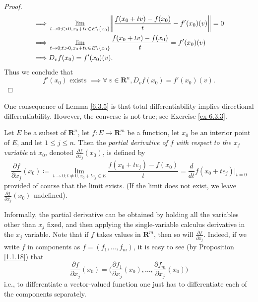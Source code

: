 \begin{proof}
\begin{align*}
        \implies & \lim_{t \to 0 ; t > 0, x_0 + tv \in E \setminus \{x_0\}} \norm*{\frac{f(x_0 + tv) - f(x_0)}{t} - f'(x_0)(v)} = 0                                   \\
        \implies & \lim_{t \to 0 ; t > 0, x_0 + tv \in E \setminus \{x_0\}} \frac{f(x_0 + tv) - f(x_0)}{t} = f'(x_0)(v)                                               \\
        \implies & D_v f(x_0) = f'(x_0)(v).
    \end{align*}
    Thus we conclude that
    \[
        f'(x_0) \text{ exists } \implies \forall\ v \in \mathbf{R}^n, D_v f(x_0) = f'(x_0)(v).
    \]
\end{proof}

\begin{remark}\label{6.3.6}
    One consequence of Lemma \ref{6.3.5} is that total differentiability implies directional differentiability.
    However, the converse is not true;
    see Exercise \ref{ex 6.3.3}.
\end{remark}

\begin{definition}\label{6.3.7}
    Let \(E\) be a subset of \(\mathbf{R}^n\), let \(f : E \to \mathbf{R}^m\) be a function, let \(x_0\) be an interior point of \(E\), and let \(1 \leq j \leq n\).
    Then the \emph{partial derivative of \(f\) with respect to the \(x_j\) variable} at \(x_0\), denoted \(\frac{\partial f}{\partial x_j}(x_0)\), is defined by
    \[
        \frac{\partial f}{\partial x_j}(x_0) \coloneqq \lim_{t \to 0 ; t \neq 0, x_0 + t e_j \in E} \frac{f(x_0 + t e_j) - f(x_0)}{t} = \frac{d}{dt} f(x_0 + t e_j)|_{t = 0}
    \]
    provided of course that the limit exists.
    (If the limit does not exist, we leave \(\frac{\partial f}{\partial x_j}(x_0)\) undefined).
\end{definition}

\begin{additional corollary}\label{ac 6.3.1}
Informally, the partial derivative can be obtained by holding all the variables other than \(x_j\) fixed, and then applying the single-variable calculus derivative in the \(x_j\) variable.
Note that if \(f\) takes values in \(\mathbf{R}^m\), then so will \(\frac{\partial f}{\partial x_j}\).
Indeed, if we write \(f\) in components as \(f = (f_1, \dots, f_m)\), it is easy to see (by Proposition \ref{1.1.18}) that
\[
    \frac{\partial f}{\partial x_j}(x_0) = \bigg(\frac{\partial f_1}{\partial x_j}(x_0), \dots, \frac{\partial f_m}{\partial x_j}(x_0)\bigg)
\]
i.e., to differentiate a vector-valued function one just has to differentiate each of the components separately.
\end{additional corollary}

